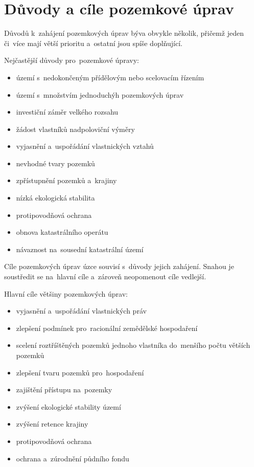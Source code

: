 \section{Důvody a cíle pozemkové úprav}
\label{duvody_cile_pu}

Důvodů k~zahájení pozemkových úprav býva obvykle několik, přičemž jeden či~více mají větší prioritu a~ostatní jsou spíše doplňující.

Nejčastější důvody pro~pozemkové úpravy:
	\begin{itemize}[leftmargin=1.5cm, noitemsep]
		\item území s~nedokončeným přídělovým nebo scelovacím řízením
		\item území s~množstvím jednoduchýh pozemkových úprav
		\item investiční záměr velkého rozsahu
		\item žádost vlastníků nadpoloviční výměry
		\item vyjasnění a~uspořádání vlastnických vztahů
		\item nevhodné tvary pozemků
		\item zpřístupnění pozemků a~krajiny
		\item nízká ekologická stabilita
		\item protipovodňová ochrana
		\item obnova katastrálního operátu
		\item návaznost na~sousední katastrální území
	\end{itemize}

Cíle pozemkových úprav úzce souvisí s~důvody jejich zahájení. Snahou je soustředit se na~hlavní cíle a~zároveň neopomenout cíle vedlejší.

Hlavní cíle většiny pozemkových úprav:
	\begin{itemize}[leftmargin=1.5cm, noitemsep]
		\item vyjasnění a~uspořádání vlastnických práv
		\item zlepšení podmínek pro~racionální zemědělské hospodaření
		\item scelení roztříštěných pozemků jednoho vlastníka do~menšího počtu větších pozemků
		\item zlepšení tvaru pozemků pro~hospodaření
		\item zajištění přístupu na~pozemky
		\item zvýšení ekologické stability území
		\item zvýšení retence krajiny
		\item protipovodňová ochrana
		\item ochrana a~zúrodnění půdního fondu
	\end{itemize}

